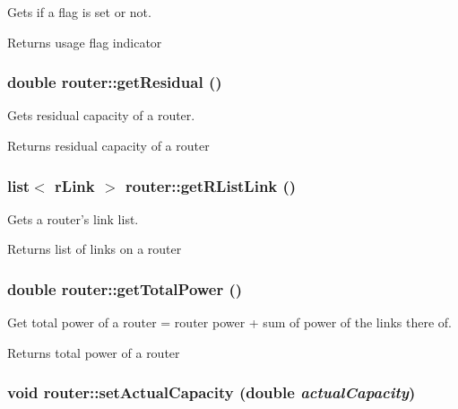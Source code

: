 Gets if a flag is set or not. 

\begin{DoxyReturn}{Returns}
usage flag indicator 
\end{DoxyReturn}
\hypertarget{classrouter_a7d5187977fd2dbf2fa562d3953647699}{
\subsubsection[{getResidual}]{\setlength{\rightskip}{0pt plus 5cm}double router::getResidual ()}}
\label{classrouter_a7d5187977fd2dbf2fa562d3953647699}


Gets residual capacity of a router. 

\begin{DoxyReturn}{Returns}
residual capacity of a router 
\end{DoxyReturn}
\hypertarget{classrouter_a36115bd5923217c64922b2231f05c304}{
\subsubsection[{getRListLink}]{\setlength{\rightskip}{0pt plus 5cm}list$<$ {\bf rLink} $>$ router::getRListLink ()}}
\label{classrouter_a36115bd5923217c64922b2231f05c304}


Gets a router's link list. 

\begin{DoxyReturn}{Returns}
list of links on a router 
\end{DoxyReturn}
\hypertarget{classrouter_a425b6d8372b0951a77097d0e6b49914a}{
\subsubsection[{getTotalPower}]{\setlength{\rightskip}{0pt plus 5cm}double router::getTotalPower ()}}
\label{classrouter_a425b6d8372b0951a77097d0e6b49914a}


Get total power of a router = router power + sum of power of the links there of. 

\begin{DoxyReturn}{Returns}
total power of a router 
\end{DoxyReturn}
\hypertarget{classrouter_a90c5339e7bed5597f06be903305ef588}{
\subsubsection[{setActualCapacity}]{\setlength{\rightskip}{0pt plus 5cm}void router::setActualCapacity (double {\em actualCapacity})}}
\label{classrouter_a90c5339e7bed5597f06be903305ef588}


